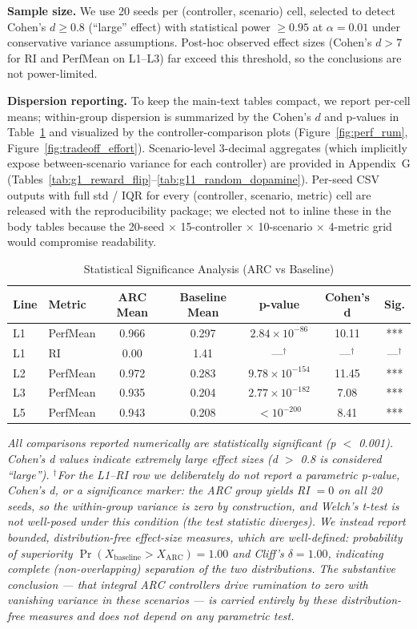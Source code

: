 \documentclass{article}
\begin{document}
\textbf{Sample size.} We use 20 seeds per (controller, scenario) cell, selected to detect Cohen's $d \geq 0.8$ (``large'' effect) with statistical power $\geq 0.95$ at $\alpha = 0.01$ under conservative variance assumptions. Post-hoc observed effect sizes (Cohen's $d > 7$ for RI and PerfMean on L1--L3) far exceed this threshold, so the conclusions are not power-limited.

\textbf{Dispersion reporting.} To keep the main-text tables compact, we report per-cell means; within-group dispersion is summarized by the Cohen's $d$ and p-values in Table~\ref{tab:significance} and visualized by the controller-comparison plots (Figure~\ref{fig:perf_rum}, Figure~\ref{fig:tradeoff_effort}). Scenario-level 3-decimal aggregates (which implicitly expose between-scenario variance for each controller) are provided in Appendix~G (Tables~\ref{tab:g1_reward_flip}--\ref{tab:g11_random_dopamine}). Per-seed CSV outputs with full std / IQR for every (controller, scenario, metric) cell are released with the reproducibility package; we elected not to inline these in the body tables because the 20-seed $\times$ 15-controller $\times$ 10-scenario $\times$ 4-metric grid would compromise readability.

\begin{table}[htbp]
\centering
\caption{Statistical Significance Analysis (ARC vs Baseline)}
\label{tab:significance}
\begin{tabular}{@{}llccccc@{}}
\toprule
Line & Metric & ARC Mean & Baseline Mean & p-value & Cohen's d & Sig. \\ \midrule
L1 & PerfMean & 0.966 & 0.297 & $2.84 \times 10^{-86}$ & 10.11 & *** \\
L1 & RI & 0.00 & 1.41 & ---$^\dagger$ & ---$^\dagger$ & ---$^\dagger$ \\
L2 & PerfMean & 0.972 & 0.283 & $9.78 \times 10^{-154}$ & 11.45 & *** \\
L3 & PerfMean & 0.935 & 0.204 & $2.77 \times 10^{-182}$ & 7.08 & *** \\
L5 & PerfMean & 0.943 & 0.208 & $< 10^{-200}$ & 8.41 & *** \\ \bottomrule
\end{tabular}
\end{table}

\textit{All comparisons reported numerically are statistically significant (p $<$ 0.001). Cohen's d values indicate extremely large effect sizes (d $>$ 0.8 is considered ``large''). $^\dagger$For the L1--RI row we deliberately do not report a parametric p-value, Cohen's d, or a significance marker: the ARC group yields RI $= 0$ on all 20 seeds, so the within-group variance is zero by construction, and Welch's t-test is not well-posed under this condition (the test statistic diverges). We instead report bounded, distribution-free effect-size measures, which are well-defined: probability of superiority $\Pr(X_{\text{baseline}} > X_{\text{ARC}}) = 1.00$ and Cliff's $\delta = 1.00$, indicating complete (non-overlapping) separation of the two distributions. The substantive conclusion --- that integral ARC controllers drive rumination to zero with vanishing variance in these scenarios --- is carried entirely by these distribution-free measures and does not depend on any parametric test.}
\end{document}
